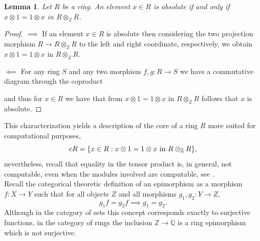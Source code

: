 \documentclass{amsart}
\newtheorem{lemma}[subsection]{Lemma}
\newcommand{\Z}{{\mathbb Z}}
\newcommand{\Q}{{\mathbb Q}}
\begin{document}
    \begin{lemma}
        Let $R$ be a ring.
        An element $x \in R$ is absolute if and only if $x \otimes 1 = 1 \otimes x$ in $R \otimes_\Z R$.
    \end{lemma}
    \begin{proof}
        $\implies$ If an element $x \in R$ is absolute then considering the two projection morphism $R \to R \otimes_\Z R$ to the left and right coordinate, respectively, we obtain $x \otimes 1 = 1 \otimes x$ in $R \otimes_\Z R$.
        
        $\impliedby$ For any ring $S$ and any two morphism $f,g: R \to S$ we have a commutative diagram through the coproduct
    \begin{center}
    \end{center}
    and thus for $x \in R$ we have that from $x \otimes 1 = 1 \otimes x$ in $R \otimes_\Z R$ follows that $x$ is absolute.
    \end{proof}

    This characterization yields a description of the core of a ring $R$ more suited for computational purposes,
    $$
    cR = \{x \in R : x \otimes 1 = 1 \otimes x \textup{ in } R \otimes_\Z R\},
    $$
    nevertheless, recall that equality in the tensor product is, in general, not computable, even when the modules involved are computable, see \cite{Bac94}.\\

    Recall the categorical theoretic definition of an epimorphism as a morphism $f : X \to Y$ such that for all objects $Z$ and all morphisms $g_1, g_2: Y \to Z$,
    $$
    g_1f = g_2f \implies g_1 = g_2.
    $$
    Although in the category of sets this concept corresponds exactly to surjective functions, in the category of rings the inclusion $\Z \to \Q$ is a ring epimorphism which is not surjective.
\end{document}
